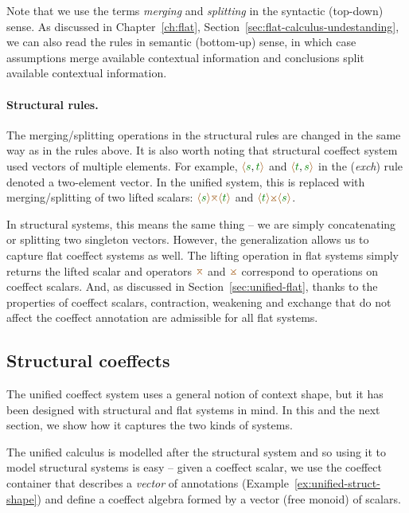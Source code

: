 Note that we use the terms \emph{merging} and \emph{splitting} in the syntactic (top-down) sense. As 
discussed in Chapter~\ref{ch:flat}, Section~\ref{sec:flat-calculus-undestanding}, we can also read 
the rules in semantic (bottom-up) sense, in which case assumptions merge available contextual 
information and conclusions split available contextual information.

\paragraph{Structural rules.}
The merging/splitting operations in the structural rules are changed in the same way as in the
rules above. It is also worth noting that structural coeffect system used vectors of multiple 
elements. For example, $\alift{\cclrd{s},\cclrd{t}}$ and $\alift{\cclrd{t},\cclrd{s}}$ in the (\emph{exch}) 
rule denoted a two-element vector. In the unified system, this is replaced with merging/splitting
of two lifted scalars: $\alift{\cclrd{s}} \azip \alift{\cclrd{t}}$ and $\alift{\cclrd{t}} \apar \alift{\cclrd{s}}$.

In structural systems, this means the same thing -- we are simply concatenating or splitting two 
singleton vectors. However, the generalization allows us to capture flat coeffect systems as well.
The lifting operation in flat systems simply returns the lifted scalar and operators $\azip$ and
$\apar$ correspond to operations on coeffect scalars. And, as discussed in Section~\ref{sec:unified-flat},
thanks to the properties of coeffect scalars, contraction, weakening and exchange that do not 
affect the coeffect annotation are admissible for all flat systems.


\subsection{Structural coeffects}
\label{sec:unified-structural}

The unified coeffect system uses a general notion of context shape, but it has been designed with 
structural and flat systems in mind. In this and the next section, we show how it captures 
the two kinds of systems. 

The unified calculus is modelled after the structural system and so using it to model structural
systems is easy -- given a coeffect scalar, we use the coeffect container that describes a \emph{vector} 
of annotations (Example~\ref{ex:unified-struct-shape}) and define a coeffect algebra formed by
a vector (free monoid) of scalars.


